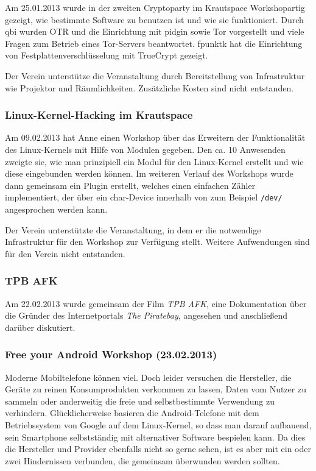 \documentclass[10pt,DIV16]{scrartcl}
\begin{document}
Am 25.01.2013 wurde in der zweiten Cryptoparty im Krautspace
Workshopartig gezeigt, wie bestimmte Software zu benutzen ist und wie
sie funktioniert. Durch qbi wurden OTR und die Einrichtung mit pidgin
sowie Tor vorgestellt und viele Fragen zum Betrieb eines Tor-Servers
beantwortet. fpunktk hat die Einrichtung von Festplattenverschlüsselung
mit TrueCrypt gezeigt.

Der Verein unterstütze die Veranstaltung durch Bereitstellung von
Infrastruktur wie Projektor und Räumlichkeiten. Zusätzliche Kosten sind
nicht entstanden.

\subsubsection{Linux-Kernel-Hacking im Krautspace}

Am 09.02.2013 hat Anne einen Workshop über das Erweitern der
Funktionalität des Linux-Kernels mit Hilfe von Modulen gegeben. Den ca.
10 Anwesenden zweigte sie, wie man prinzipiell ein Modul für den
Linux-Kernel erstellt und wie diese eingebunden werden können. Im
weiteren Verlauf des Workshops wurde dann gemeinsam ein Plugin
erstellt, welches einen einfachen Zähler implementiert, der über ein
char-Device innerhalb von zum Beispiel \texttt{/dev/} angesprochen
werden kann.

Der Verein unterstützte die Veranstaltung, in dem er die notwendige
Infrastruktur für den Workshop zur Verfügung stellt. Weitere
Aufwendungen sind für den Verein nicht entstanden.

\subsubsection{TPB AFK}

Am 22.02.2013 wurde gemeinsam der Film \textit{TPB AFK}, eine
Dokumentation über die Gründer des Internetportals \textit {The
Piratebay}, angesehen und anschließend darüber diskutiert.


\subsubsection{Free your Android Workshop (23.02.2013)}
\label{sec:free-your-android}

Moderne Mobiltelefone können viel. Doch leider versuchen die Hersteller,
die Geräte zu reinen Konsumprodukten verkommen zu lassen, Daten vom
Nutzer zu sammeln oder anderweitig die freie und selbstbestimmte
Verwendung zu verhindern. Glücklicherweise basieren die
Android-Telefone mit dem Betriebssystem von Google auf dem
Linux-Kernel, so dass man darauf aufbauend, sein Smartphone
selbstständig mit alternativer Software bespielen kann. Da dies die
Hersteller und Provider ebenfalls nicht so gerne sehen, ist es
aber mit ein oder zwei Hindernissen verbunden, die gemeinsam
überwunden werden sollten.
\end{document}
